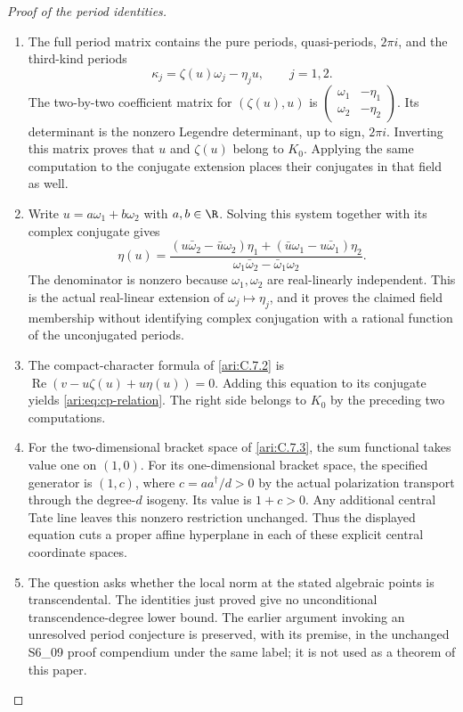 \begin{proof}[Proof of the period identities]
\begin{enumerate}[label=\arabic*.,leftmargin=*]
\item The full period matrix contains the pure periods, quasi-periods,
$2\pi i$, and the third-kind periods
\[
 \kappa_j=\zeta(u)\omega_j-\eta_j u,\qquad j=1,2.
\]
The two-by-two coefficient matrix for $(\zeta(u),u)$ is
$\left(\begin{smallmatrix}\omega_1&-\eta_1\\
\omega_2&-\eta_2\end{smallmatrix}\right)$.
Its determinant is the nonzero Legendre determinant, up to sign,
$2\pi i$. Inverting this matrix proves that $u$ and $\zeta(u)$
belong to $K_0$. Applying the same computation to the conjugate
extension places their conjugates in that field as well.

\item Write $u=a\omega_1+b\omega_2$ with $a,b\in\R$. Solving this
system together with its complex conjugate gives
\begin{equation}\label{ari:eq:cp-real-linear}
 \eta(u)=
 \frac{(u\bar\omega_2-\bar u\omega_2)\eta_1
       +(\bar u\omega_1-u\bar\omega_1)\eta_2}
      {\omega_1\bar\omega_2-\bar\omega_1\omega_2}.
\end{equation}
The denominator is nonzero because $\omega_1,\omega_2$ are
real-linearly independent. This is the actual real-linear extension
of $\omega_j\mapsto\eta_j$, and it proves the claimed field
membership without identifying complex conjugation with a
rational function of the unconjugated periods.

\item The compact-character formula of \cref{ari:C.7.2} is
$\operatorname{Re}(v-u\zeta(u)+u\eta(u))=0$.
Adding this equation to its conjugate yields
\eqref{ari:eq:cp-relation}. The right side belongs to $K_0$ by
the preceding two computations.

\item For the two-dimensional bracket space of \cref{ari:C.7.3},
the sum functional takes value one on $(1,0)$.
For its one-dimensional bracket space, the specified generator
is $(1,c)$, where $c=aa^\dagger/d>0$ by the actual polarization
transport through the degree-$d$ isogeny. Its value is $1+c>0$.
Any additional central Tate line leaves this nonzero restriction
unchanged. Thus the displayed equation cuts a proper affine
hyperplane in each of these explicit central coordinate spaces.

\item The question asks whether the local norm at the stated algebraic
points is transcendental. The identities just proved give no
unconditional transcendence-degree lower bound. The earlier
argument invoking an unresolved period conjecture is preserved,
with its premise, in the unchanged S6\_09 proof compendium under
the same label; it is not used as a theorem of this paper.
\end{enumerate}
\end{proof}